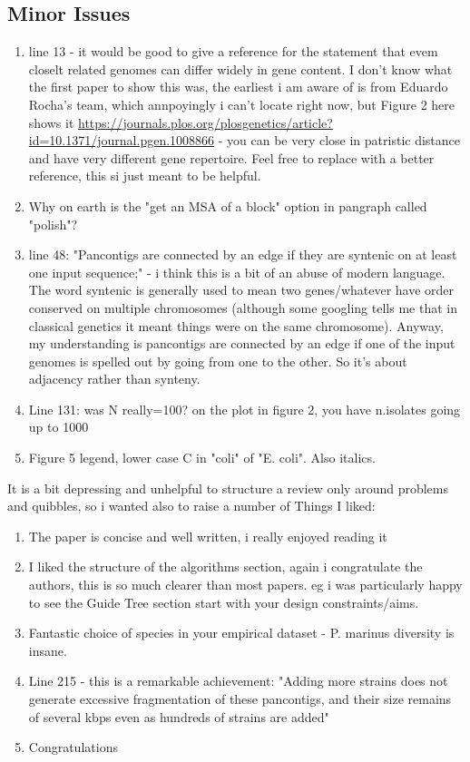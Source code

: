 \documentclass{article}
\begin{document}
\subsection*{Minor Issues}

\begin{enumerate}
    \item line 13 - it would be good to give a reference for the statement that evem closelt related genomes can differ widely in gene content.
          I don't know what the first paper to show this was, the earliest i am aware of is from Eduardo Rocha's team, which annpoyingly i can't locate right now, but Figure 2 here shows it \url{https://journals.plos.org/plosgenetics/article?id=10.1371/journal.pgen.1008866} - you can be very close in patristic distance and have very different gene repertoire.
          Feel free to replace with a better reference, this si just meant to be helpful.

    \item Why on earth is the "get an MSA of a block" option in pangraph called "polish"?

    \item line 48: "Pancontigs are connected by an edge if they are syntenic on at least one input sequence;" - i think this is a bit of an abuse of modern language. The word syntenic is generally used to mean two genes/whatever have order conserved on multiple chromosomes (although some googling tells me that in classical genetics it meant things were on the same chromosome). Anyway, my understanding is pancontigs are connected by an edge if one of the input genomes is spelled out by going from one to the other. So it's about adjacency rather than synteny.

    \item Line 131: was N really=100? on the plot in figure 2, you have n.isolates going up to 1000

    \item Figure 5 legend, lower case C in "coli" of "E. coli". Also italics.
\end{enumerate}


It is a bit depressing and unhelpful to structure a review only around problems and quibbles, so i wanted also to raise a number of
Things I liked:

\begin{enumerate}
    \item The paper is concise and well written, i really enjoyed reading it
    \item I liked the structure of the algorithms section, again i congratulate the authors, this is so much clearer than most papers. eg i was particularly happy to see the Guide Tree section start with your design constraints/aims.
    \item Fantastic choice of species in your empirical dataset - P. marinus diversity is insane.
    \item Line 215 - this is a remarkable achievement: "Adding more strains does not generate excessive fragmentation of these pancontigs, and their size remains of several kbps even as hundreds of strains are added"
    \item Congratulations
\end{enumerate}
\end{document}
